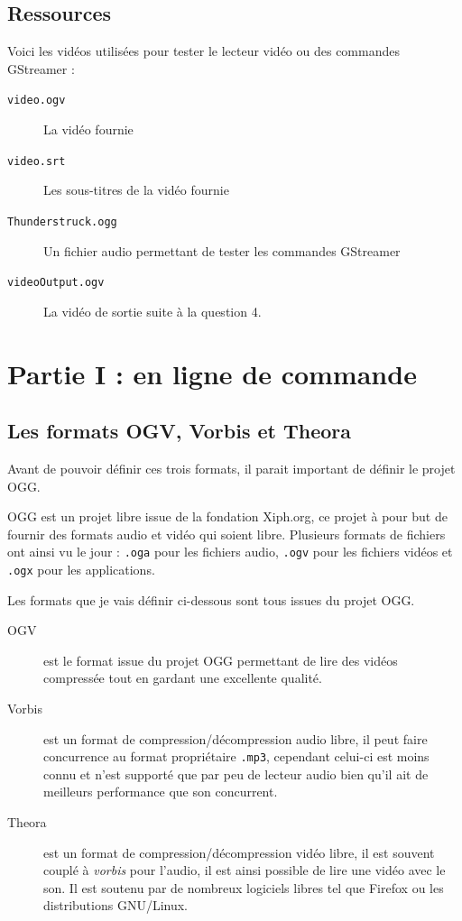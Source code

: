\documentclass[a4paper, 11pt]{article}
\begin{document}
	\subsection{Ressources}\label{ressources}
	Voici les vidéos utilisées pour tester le lecteur vidéo ou des commandes GStreamer : 
	\begin{description}
		\item[\texttt{video.ogv}] La vidéo fournie
		\item[\texttt{video.srt}] Les sous-titres de la vidéo fournie
		\item[\texttt{Thunderstruck.ogg}] Un fichier audio permettant de tester les commandes GStreamer
		\item[\texttt{videoOutput.ogv}] La vidéo de sortie suite à la question 4.
	\end{description}
	\section{Partie I : en ligne de commande}
	\subsection{Les formats OGV, Vorbis et Theora}
	Avant de pouvoir définir ces trois formats, il parait important de définir le projet OGG.

	OGG est un projet libre issue de la fondation Xiph.org, ce projet à pour but de fournir des formats audio et vidéo qui soient libre. Plusieurs formats de
	fichiers ont ainsi vu le jour : \texttt{.oga} pour les fichiers audio, \texttt{.ogv} pour les fichiers vidéos et \texttt{.ogx} pour les applications.
	
	Les formats que je vais définir ci-dessous sont tous issues du projet OGG.
	\begin{description}
		\item[OGV] est le format issue du projet OGG permettant de lire des vidéos compressée tout en gardant une excellente qualité.
		\item[Vorbis] est un format de compression/décompression audio libre, il peut faire concurrence au format propriétaire \texttt{.mp3}, cependant celui-ci est
			moins connu et n'est supporté que par peu de lecteur audio bien qu'il ait de meilleurs performance que son concurrent.
		\item[Theora] est un format de compression/décompression vidéo libre, il est souvent couplé à \textit{vorbis} pour l'audio, il est ainsi possible de lire une
			vidéo avec le son. Il est soutenu par de nombreux logiciels libres tel que Firefox ou les distributions GNU/Linux. 
	\end{description}
\end{document}
